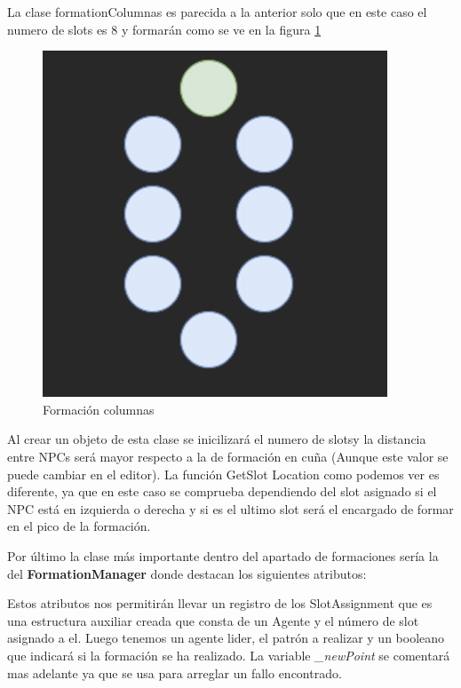 La clase formationColumnas es parecida a la anterior solo que en este caso el numero de slots es 8 y formarán como se ve en la figura \ref{fig:cols}
\begin{figure}
    \centering
    \includegraphics[scale=0.7]{formaciones/Screenshot 2022-04-01 at 19.03.24.png}
    \caption{Formación columnas}
    \label{fig:cols}
\end{figure}
Al crear un objeto de esta clase se inicilizará el numero de slotsy la distancia entre NPCs será mayor respecto a la de formación en cuña (Aunque este valor se puede cambiar en el editor). La función GetSlot Location como podemos ver es diferente, ya que en este caso se comprueba dependiendo del slot asignado si el NPC está en izquierda o derecha y si es el ultimo slot será el encargado de formar en el pico de la formación.




Por último la clase más importante dentro del apartado de formaciones sería la del \textbf{FormationManager} donde destacan los siguientes atributos: 


Estos atributos nos permitirán llevar un registro de los SlotAssignment que es una estructura auxiliar creada que consta de un Agente y el número de slot asignado a el. Luego tenemos un agente lider, el patrón a realizar y un booleano que indicará si la formación se ha realizado. La variable \textit{\_newPoint} se comentará mas adelante ya que se usa para arreglar un fallo encontrado.\\

